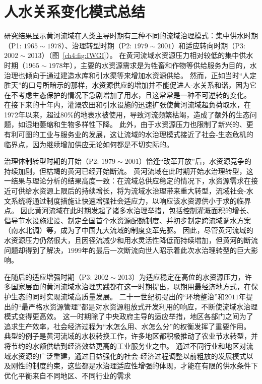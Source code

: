 \section{人水关系变化模式总结}

研究结果显示黄河流域在人类主导时期有三种不同的流域治理模式：集中供水时期（P1: $1965 \sim 1978$）、治理转型时期（P2: $1979 \sim 2001$）和适应转向时期（P3: $2002 \sim 2013$）（图~\ref{ch4:fig:IWGI}）。
在黄河流域水资源压力相对较低的集中供水时期（$1965 \sim 1978$年），主要的水资源需求是为牲畜和作物等供给服务为目的，水治理也倾向于通过建造水库和引水渠等来增加水资源供给。
然而，正如当时“人定胜天”的口号所暗示的那样，水资源供应的增加并不能促进人-水关系和谐，因为它在不考虑生态保护的情况下急剧增加了用水，且这常常是一种不可逆转的变化\cite{zhou2020}。
在接下来的十年内，灌溉农田和引水设施的迅速扩张使黄河流域超负荷取水，在1972年以来，超过$80\%$的地表水被使用，导致河流频繁枯竭，造成了额外的生态问题，如湿地萎缩和生物多样性下降\cite{wang2019c}。
此外，由于水资源压力也限制了新兴的、更有利可图的工业与服务业的发展，这让流域的水治理模式接近了社会-生态危机的临界点，因为继续增加供应无论如何都是不切实际的\cite{loch2020, wohlfart2016a}。

治理体制转型时期的开始（P2: $1979 \sim 2001$）恰逢“改革开放”后，水资源竞争的持续加剧，但枯竭的黄河已经开始断流。
黄河流域在此时期开始水治理转型，这一结果与理论分析的结果高度一致：在流域总供应稳定的情况下，水资源需求在接近可供给水资源上限后的持续增长，将为流域水治理带来重大转型，流域社会-水文系统将通过制度措施让快速增强社会适应力，以响应该水资源供小于求的临界点\cite{loch2020}。
因此黄河流域在此时期发起了诸多水治理举措，包括控制灌溉面积的增长、倡导节水设施建设、制定全国首个水资源配额制度、并初步制定跨流域调水方案（南水北调）等\cite{wang2019b,long2020,nickum2021}，成为了中国九大流域的制度变革先驱。
因此，尽管黄河流域的水资源压力仍然很大，且因径流减少和用水灵活性降低而持续增加，但黄河的断流问题却得到了解决，$1999$年的最后一次断流向世人昭示着此次水治理转型的巨大影响\cite{wang2019b}。

在随后的适应增强时期（P3: $2002 \sim 2013$）为适应稳定在高位的水资源压力，许多国家层面的黄河流域水治理实践都在这一时期提出，以期用最经济地方式，在保护生态的同时实现流域高质量发展。
二十一世纪初提出的“环境整治”和$2011$年提出的“最严格水资源管理”都是对水资源粗放式开发利用的响应，不断使流域水治理模式变得更高效。
这一时期除了中央政府主导的适应举措，地区各部门之间为了追求生产效率，社会经济过程为“水怎么用、水怎么分”的权衡发挥了重要作用。
典型的例子是黄河流域的水权转换工作，许多地区都积极推动了农业节水转型，并将节约的水额供给到经济效益更高的工业服务业之中。
通过不同行业和地区对流域水资源的广泛重建，通过日益强化的社会-经济过程调整以前粗放的发展模式以及刚性的制度约束，这些都是水治理适应性增强的体现，才能在有限的供水条件下优化平衡来自不同地区、不同行业的需求\cite{dalin2015,song2022}

